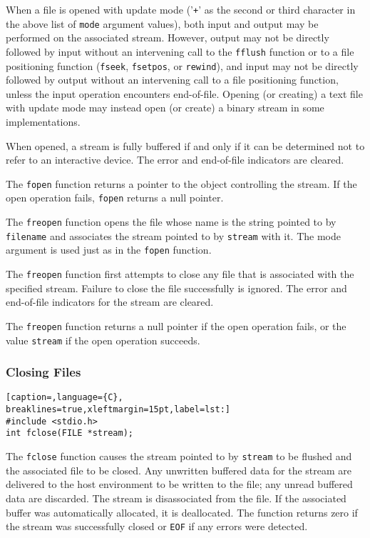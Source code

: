 When a file is opened with update mode ('\texttt{+}' as the second or third
character in the above list of \texttt{mode} argument values), both input and
output may be performed on the associated stream. However, output may not be
directly followed by input without an intervening call to the \texttt{fflush}
function or to a file positioning function (\texttt{fseek}, \texttt{fsetpos},
or \texttt{rewind}), and input may not be directly followed by output without
an intervening call to a file positioning function, unless the input operation
encounters end-of-file. Opening (or creating) a text file with update mode may
instead open (or create) a binary stream in some implementations.

When opened, a stream is fully buffered if and only if it can be determined not
to refer to an interactive device. The error and end-of-file indicators are
cleared.

The \texttt{fopen} function returns a pointer to the object controlling the
stream. If the open operation fails, \texttt{fopen} returns a null pointer.

The \texttt{freopen} function opens the file whose name is the string pointed
to by \texttt{filename} and associates the stream pointed to by \texttt{stream}
with it. The mode argument is used just as in the \texttt{fopen} function.

The \texttt{freopen} function first attempts to close any file that is
associated with the specified stream. Failure to close the file successfully is
ignored. The error and end-of-file indicators for the stream are cleared.

The \texttt{freopen} function returns a null pointer if the open operation
fails, or the value \texttt{stream} if the open operation succeeds. 

\subsubsection{Closing Files}
\lstset{basicstyle=\scriptsize, numbers=left, captionpos=b, tabsize=4}
\begin{lstlisting}[caption=,language={C},
breaklines=true,xleftmargin=15pt,label=lst:]
#include <stdio.h>
int fclose(FILE *stream);
\end{lstlisting}

The \texttt{fclose} function causes the stream pointed to by \texttt{stream} to
be flushed and the associated file to be closed. Any unwritten buffered data
for the stream are delivered to the host environment to be written to the file;
any unread buffered data are discarded. The stream is disassociated from the
file. If the associated buffer was automatically allocated, it is deallocated.
The function returns zero if the stream was successfully closed or \texttt{EOF}
if any errors were detected.

